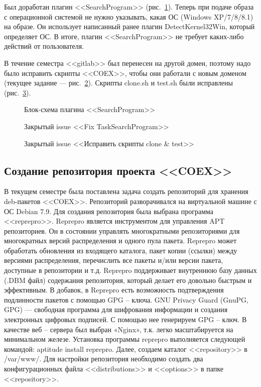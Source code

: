 Был доработан плагин <<SearchProgram>> (рис.~\ref{kucher_1:kucher_1}). Теперь при подаче образа с операционной системой не нужно указывать, какая ОС (Windows XP/7/8/8.1) на образе. Он использует написанный ранее плагин DetectKernel32Win, который определяет ОС. В итоге, плагин <<SearchProgram>> не требует каких-либо действий от пользователя.

В течение семестра <<gitlab>> был перенесен на другой домен, поэтому надо было исправить скрипты <<COEX>>, чтобы они работали с новым доменом (текущее задание --- рис.~\ref{kucher_2:kucher_2}). Скрипты clone.sh и test.sh были исправлены (рис.~\ref{kucher_3:kucher_3}).

\begin{figure}[h!]
\caption{ Блок-схема плагина <<SearchProgram>> }
\label{kucher_1:kucher_1}
\end{figure}

\begin{figure}[h!]
\caption{ Закрытый issue <<Fix TaskSearchProgram>> }
\label{kucher_2:kucher_2}
\end{figure}
	
\begin{figure}[h!]
\caption{ Закрытый issue <<Исправить скрипты clone & test>> }
\label{kucher_3:kucher_3}
\end{figure}
	
\clearpage 
\subsection{Создание репозитория проекта <<COEX>>}

В текущем семестре была поставлена задача создать репозиторий для хранения deb-пакетов <<COEX>>.
Репозиторий разворачивался на виртуальной машине с ОС Debian 7.9. Для создания репозитория была выбрана программа <<reprepro>>.
Reprepro является инструментом для управления APT репозиториев. Он в состоянии управлять многократными репозиториями для многократных версий распределения и одного пула пакета. Reprepro может обработать обновления из входящего каталога, пакет копии (ссылки) между версиями распределения, перечислить все пакеты и/или версии пакета, доступные в репозитории и т.д. 
Reprepro поддерживает внутреннюю базу данных (.DBM файл) содержания репозитория, который делает его довольно быстрым и эффективным.
В добавок, в Reprepro есть возможность подтверждения подлинности пакетов с помощью GPG – ключа.
GNU Privacy Guard (GnuPG, GPG) — свободная программа для шифрования информации и создания электронных цифровых подписей. С помощью нее генерируем GPG – ключ.
В качестве веб – сервера был выбран «Nginx», т.к. легко масштабируется на минимальном железе.
Установка программы reprepro выполняется следующей командой: aptitude install reprepro. Далее, создаем каталог <<repository>> в /var/www/. Для настройки репозитория необходимо создать два конфигурационных файла <<distributions>> и <<options>> в папке <<repository>>.~\cite{anosov} 

